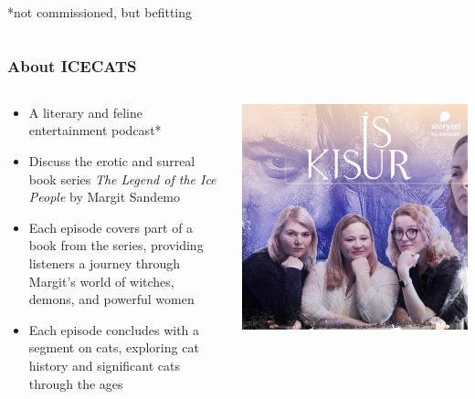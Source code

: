 \begin{frame}
\begin{columns}[T]
\begin{column}{0.4\textwidth}
            \vspace{24pt}

            \scriptsize{*not commissioned, but befitting}
        \end{column}
    \end{columns}
\end{frame}

\begin{frame}
    \frametitle{About ICECATS}
    \begin{columns}[T]
        \begin{column}{0.55\textwidth}
            \begin{itemize}
                \item A literary and feline entertainment podcast*
                \item Discuss the erotic and surreal book series \emph{The Legend of the Ice People} by Margit Sandemo
                \item Each episode covers part of a book from the series, providing listeners a journey through
                Margit's world of witches, demons, and powerful women
                \item Each episode concludes with a segment on cats, exploring cat history and significant
                cats through the ages
            \end{itemize}
        \end{column}
        \begin{column}{0.45\textwidth}
            \centering
            \includegraphics[width=\textwidth]{../figures/podcast_image.jpg}

\end{column}
\end{columns}
\end{frame}
